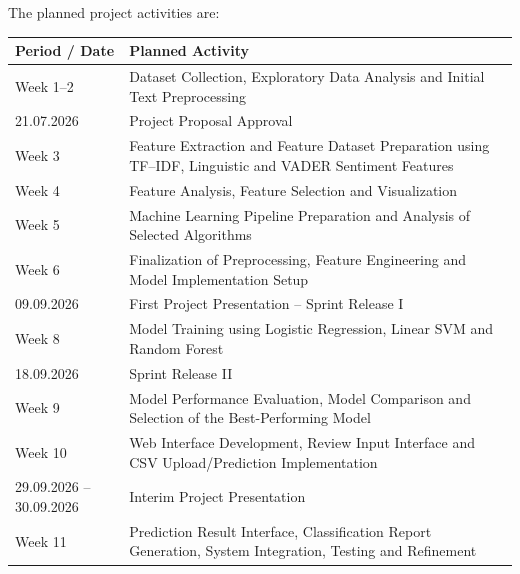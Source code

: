 \documentclass[12pt,a4paper]{report}
\begin{document}
The planned project activities are:

\begin{table}[H]
\centering
\renewcommand{\arraystretch}{1.5}
\setlength{\tabcolsep}{8pt}

\begin{tabularx}{\textwidth}{|p{3.5cm}|X|}
\hline
\textbf{Period / Date} & \textbf{Planned Activity} \\
\hline

Week 1--2 &
Dataset Collection, Exploratory Data Analysis and Initial Text Preprocessing \\
\hline

21.07.2026 &
Project Proposal Approval \\
\hline

Week 3 &
Feature Extraction and Feature Dataset Preparation using TF--IDF, Linguistic and VADER Sentiment Features \\
\hline

Week 4 &
Feature Analysis, Feature Selection and Visualization \\
\hline

Week 5 &
Machine Learning Pipeline Preparation and Analysis of Selected Algorithms \\
\hline

Week 6 &
Finalization of Preprocessing, Feature Engineering and Model Implementation Setup \\
\hline

09.09.2026 &
First Project Presentation -- Sprint Release I \\
\hline

Week 8 &
Model Training using Logistic Regression, Linear SVM and Random Forest \\
\hline

18.09.2026 &
Sprint Release II \\
\hline

Week 9 &
Model Performance Evaluation, Model Comparison and Selection of the Best-Performing Model \\
\hline

Week 10 &
Web Interface Development, Review Input Interface and CSV Upload/Prediction Implementation \\
\hline

29.09.2026 -- 30.09.2026 &
Interim Project Presentation \\
\hline

Week 11 &
Prediction Result Interface, Classification Report Generation, System Integration, Testing and Refinement \\
\hline


\end{tabularx}
\end{table}
\end{document}
